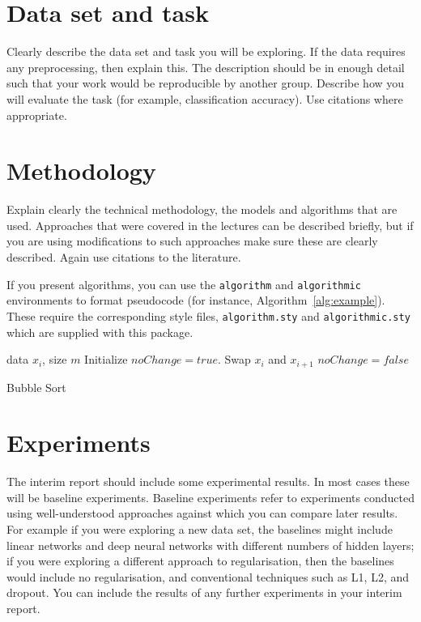 \documentclass{article}
\begin{document}
\section{Data set and task} 
Clearly describe the data set and task you will be exploring.  If the data requires any preprocessing, then explain this.  The description should be in enough detail such that your work would be reproducible by another group.  Describe how you will evaluate the task (for example, classification accuracy).  Use citations where appropriate.

\section{Methodology}
Explain clearly the technical methodology, the models and algorithms that are used.  Approaches that were covered in the lectures can be described briefly, but if you are using modifications to such approaches make sure these are clearly described.    Again use citations to the literature.

If you present algorithms, you can use the \verb+algorithm+ and \verb+algorithmic+ environments to format pseudocode (for instance, Algorithm~\ref{alg:example}). These require the corresponding style files, \verb+algorithm.sty+ and \verb+algorithmic.sty+ which are supplied with this package. 

\begin{algorithm}[ht]
\begin{algorithmic}
    data $x_i$, size $m$
   \REPEAT
   \STATE Initialize $noChange = true$.
   \STATE Swap $x_i$ and $x_{i+1}$
   \STATE $noChange = false$
   \ENDIF
   \ENDFOR
\end{algorithmic}
  \caption{Bubble Sort}
  \label{alg:example}
\end{algorithm}


\section{Experiments}
\label{sec:expts}
The interim report should include some experimental results.  In most cases these will be baseline experiments.  Baseline experiments refer to experiments conducted using well-understood approaches against which you can compare later results.  For example if you were exploring a new data set, the baselines might include linear networks and deep neural networks with different numbers of hidden layers;  if you were exploring a different approach to regularisation, then the baselines would include no regularisation, and conventional techniques such as L1, L2, and dropout.  You can include the results of any further experiments in your interim report.
\end{document}

